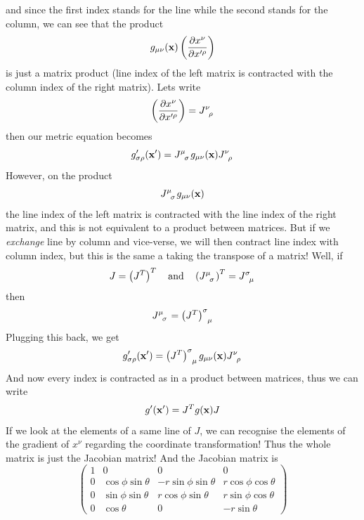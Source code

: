 \documentclass[oneside, 10pt, notitlepage]{book}
\begin{document}
and since the first index stands for the line while the second stands for the column, we can see that the product
\begin{equation}
    g_{\mu\nu}(\vb{x})\left(\pdv{x^{\nu}}{x'^{\rho}}\right)
\end{equation}
is just a matrix product (line index of the left matrix is contracted with the column index of the right matrix). Lets write
\begin{equation}
    \lr{\pdv{x^{\nu}}{x'^{\rho}}} = \tensor{J}{^{\nu}_{\rho}}
\end{equation}
then our metric equation becomes
\begin{equation}
    g'_{\sigma\rho}(\vb{x'}) = \tensor{J}{^{\mu}_{\sigma}}g_{\mu\nu}(\vb{x})\tensor{J}{^{\nu}_{\rho}}
\end{equation}
However, on the product
\begin{equation}
    \tensor{J}{^{\mu}_{\sigma}}g_{\mu\nu}(\vb{x})
\end{equation}
the line index of the left matrix is contracted with the line index of the right matrix, and this is not equivalent to a product between matrices. But if we \emph{exchange} line by column and vice-verse, we will then contract line index with column index, but this is the same a taking the transpose of a matrix! Well, if
\begin{equation}
    J = \lr{J^{T}}^{T} \qq{and} \lr{\tensor{J}{^{\mu}_{\sigma}}}^{T} = \tensor{J}{^{\sigma}_{\mu}}
\end{equation}
then
\begin{equation}
    \tensor{J}{^{\mu}_{\sigma}} = \tensor{\lr{J^T}}{^{\sigma}_{\mu}}
\end{equation}
Plugging this back, we get
\begin{equation}
    g'_{\sigma\rho}(\vb{x'}) = \tensor{\lr{J^T}}{^{\sigma}_{\mu}}g_{\mu\nu}(\vb{x})\tensor{J}{^{\nu}_{\rho}}
\end{equation}
And now every index is contracted as in a product between matrices, thus we can write
\begin{equation}
    g'(\vb{x'}) = J^T g(\vb{x}) J
\end{equation}
If we look at the elements of a same line of \(J\), we can recognise the elements of the gradient of \(x^{\nu}\) regarding the coordinate transformation! Thus the whole matrix is just the Jacobian matrix! And the Jacobian matrix is
\begin{equation}
\begin{pmatrix}
1 & 0 & 0 & 0 \\
0 & \cos \phi \sin \theta & -r\sin \phi \sin \theta & r \cos \phi \cos \theta\\
0 & \sin \phi \sin \theta & r \cos \phi \sin \theta & r \sin \phi \cos \theta\\
0 & \cos \theta & 0 & -r\sin \theta
\end{pmatrix}
\end{equation}
\end{document}
